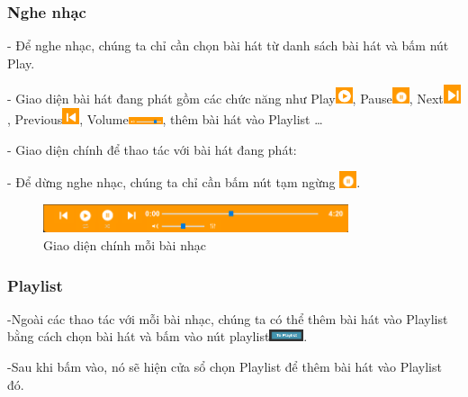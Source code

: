 \documentclass[a4paper]{article}
\begin{document}
\subsubsection{Nghe nhạc}
\begin{flushleft}
	- Để nghe nhạc, chúng ta chỉ cần chọn bài hát từ danh sách bài hát và bấm nút Play.

	- Giao diện bài hát đang phát gồm các chức năng như Play\includegraphics[width=0.5cm]{images/play-icon.png}, Pause\includegraphics[width=0.5cm]{images/pause-icon.png}, Next\includegraphics[width=0.5cm]{images/nextsong-icon.png}, Previous\includegraphics[width=0.5cm]{images/prevsong-icon.png}, Volume\includegraphics[width=1cm]{images/volume-bar.png}, thêm bài hát vào Playlist \dots

	- Giao diện chính để thao tác với bài hát đang phát:

	- Để dừng nghe nhạc, chúng ta chỉ cần bấm nút tạm ngừng \includegraphics[width=0.5cm]{images/pause-icon.png}.
	\begin{figure}[h]
		\centering
		\includegraphics[width=0.8\textwidth]{images/mainUicontrolMusic.png}
		\caption{Giao diện chính mỗi bài nhạc}
	\end{figure}
	\subsubsection{Playlist}
	-Ngoài các thao tác với mỗi bài nhạc, chúng ta có thể thêm bài hát vào Playlist bằng cách chọn bài hát và bấm vào nút playlist\includegraphics[width=1cm]{images/addplaylist-button.png}.

	-Sau khi bấm vào, nó sẽ hiện cửa sổ chọn Playlist để thêm bài hát vào Playlist đó.
\end{flushleft}
\end{document}
